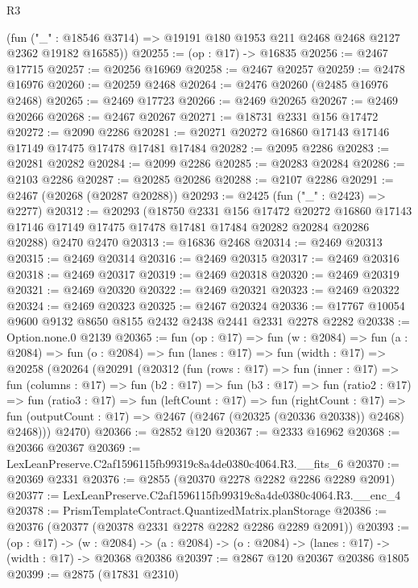 \begin{lexlean}{R3}
\begin{coremodule}
      (fun ("_" : @18546 @3714) => @19191 @180 @1953 @211 @2468 @2468 @2127 @2362 @19182 @16585))
@20255 := (op : @17) -> @16835
@20256 := @2467 @17715
@20257 := @20256 @16969
@20258 := @2467 @20257
@20259 := @2478 @16976
@20260 := @20259 @2468
@20264 := @2476 @20260 (@2485 @16976 @2468)
@20265 := @2469 @17723
@20266 := @2469 @20265
@20267 := @2469 @20266
@20268 := @2467 @20267
@20271 := @18731 @2331 @156 @17472
@20272 := @2090 @2286
@20281 := @20271 @20272 @16860 @17143 @17146 @17149 @17475 @17478 @17481 @17484
@20282 := @2095 @2286
@20283 := @20281 @20282
@20284 := @2099 @2286
@20285 := @20283 @20284
@20286 := @2103 @2286
@20287 := @20285 @20286
@20288 := @2107 @2286
@20291 := @2467 (@20268 (@20287 @20288))
@20293 := @2425 (fun ("_" : @2423) => @2277)
@20312 := @20293
    (@18750
      @2331
      @156
      @17472
      @20272
      @16860
      @17143
      @17146
      @17149
      @17475
      @17478
      @17481
      @17484
      @20282
      @20284
      @20286
      @20288)
    @2470
    @2470
@20313 := @16836 @2468
@20314 := @2469 @20313
@20315 := @2469 @20314
@20316 := @2469 @20315
@20317 := @2469 @20316
@20318 := @2469 @20317
@20319 := @2469 @20318
@20320 := @2469 @20319
@20321 := @2469 @20320
@20322 := @2469 @20321
@20323 := @2469 @20322
@20324 := @2469 @20323
@20325 := @2467 @20324
@20336 := @17767 @10054 @9600 @9132 @8650 @8155 @2432 @2438 @2441 @2331 @2278 @2282
@20338 := Option.none.{0} @2139
@20365 := fun (op : @17) =>
  fun (w : @2084) =>
  fun (a : @2084) =>
  fun (o : @2084) =>
  fun (lanes : @17) =>
  fun (width : @17) =>
  @20258
    (@20264
      (@20291
        (@20312
          (fun (rows : @17) =>
          fun (inner : @17) =>
          fun (columns : @17) =>
          fun (b2 : @17) =>
          fun (b3 : @17) =>
          fun (ratio2 : @17) =>
          fun (ratio3 : @17) =>
          fun (leftCount : @17) =>
          fun (rightCount : @17) =>
          fun (outputCount : @17) => @2467 (@2467 (@20325 (@20336 @20338)) @2468) @2468)))
      @2470)
@20366 := @2852 @120
@20367 := @2333 @16962
@20368 := @20366 @20367
@20369 := LexLeanPreserve.C2af1596115fb99319c8a4de0380c4064.R3.__fits_6
@20370 := @20369 @2331
@20376 := @2855 (@20370 @2278 @2282 @2286 @2289 @2091)
@20377 := LexLeanPreserve.C2af1596115fb99319c8a4de0380c4064.R3.__enc_4
@20378 := PrismTemplateContract.QuantizedMatrix.planStorage
@20386 := @20376 (@20377 (@20378 @2331 @2278 @2282 @2286 @2289 @2091))
@20393 := (op : @17) ->
  (w : @2084) -> (a : @2084) -> (o : @2084) -> (lanes : @17) -> (width : @17) -> @20368 @20386
@20397 := @2867 @120 @20367 @20386 @1805
@20399 := @2875 (@17831 @2310)

\end{coremodule}
\end{lexlean}
